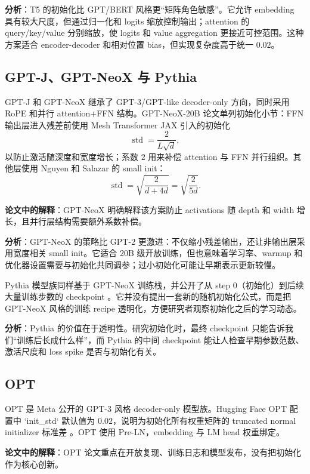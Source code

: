 \documentclass[UTF8,a4paper,11pt]{ctexart}
\newcommand{\std}{\operatorname{std}}
\begin{document}
\textbf{分析}：T5 的初始化比 GPT/BERT 风格更“矩阵角色敏感”。它允许 embedding 具有较大尺度，但通过归一化和 logits 缩放控制输出；attention 的 query/key/value 分别缩放，使 logits 和 value aggregation 更接近可控范围。这种方案适合 encoder-decoder 和相对位置 bias，但实现复杂度高于统一 $0.02$。

\subsection{GPT-J、GPT-NeoX 与 Pythia}

GPT-J 和 GPT-NeoX 继承了 GPT-3/GPT-like decoder-only 方向，同时采用 RoPE 和并行 attention+FFN 结构。GPT-NeoX-20B 论文单列初始化小节：FFN 输出层进入残差前使用 Mesh Transformer JAX 引入的初始化
\[
  \std=\frac{2}{L\sqrt{d}},
\]
以防止激活随深度和宽度增长；系数 $2$ 用来补偿 attention 与 FFN 并行组织。其他层使用 Nguyen 和 Salazar 的 small init：
\[
  \std=\sqrt{\frac{2}{d+4d}}=\sqrt{\frac{2}{5d}}.
\]
\cite{gptneoxpaper}

\textbf{论文中的解释}：GPT-NeoX 明确解释该方案防止 activations 随 depth 和 width 增长，且并行层结构需要额外系数补偿。

\textbf{分析}：GPT-NeoX 的策略比 GPT-2 更激进：不仅缩小残差输出，还让非输出层采用宽度相关 small init。它适合 20B 级开放训练，但也意味着学习率、warmup 和优化器设置需要与初始化共同调参；过小初始化可能让早期表示更新较慢。

Pythia 模型族同样基于 GPT-NeoX 训练栈，并公开了从 step 0（初始化）到后续大量训练步数的 checkpoint \cite{pythiarepo,pythiapaper}。它并没有提出一套新的随机初始化公式，而是把 GPT-NeoX 风格的训练 recipe 透明化，方便研究者观察初始化之后的学习动态。

\textbf{分析}：Pythia 的价值在于透明性。研究初始化时，最终 checkpoint 只能告诉我们“训练后长成什么样”，而 Pythia 的中间 checkpoint 能让人检查早期参数范数、激活尺度和 loss spike 是否与初始化有关。

\subsection{OPT}

OPT 是 Meta 公开的 GPT-3 风格 decoder-only 模型族。Hugging Face OPT 配置中 `init\_std` 默认值为 $0.02$，说明为初始化所有权重矩阵的 truncated normal initializer 标准差 \cite{optdocs,optpaper}。OPT 使用 Pre-LN，embedding 与 LM head 权重绑定。

\textbf{论文中的解释}：OPT 论文重点在开放复现、训练日志和模型发布，没有把初始化作为核心创新。
\end{document}

